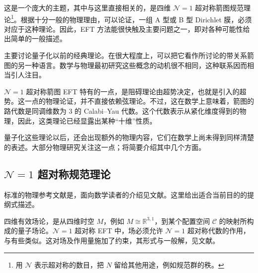 这是一个庞大的主题，其中与这里直接相关的，是四维 $\mathcal{N}=1$ 超对称箭图规范理论\footnote{用 $\mathcal{N}$ 表示超对称的数目，把 $N$ 留给其他用途，例如规范群的秩。}。根据十分一般的物理理由，可以论证，一组 A 型或 B 型 Dirichlet 膜，必须对应于这种理论。因此，EFT 方法能很快触及主要问题之一，即对各种可能性给出简单的一般描述。

主要讨论量子化以前的经典理论。在很大程度上，可以把它看作所讨论的带关系箭图的另一种语言。数学与物理最初研究这些概念的动机很不相同，这种联系因而相当引人注目。

$\mathcal{N}=1$ 超对称箭图 EFT 特有的一点，是阻碍理论由超势决定，也就是引入的超势。这一点的物理论证，并不直接依赖弦理论。不过，这在数学上意味着，箭图的路代数是同调维数为 3 的 Calabi--Yau 代数。这个代数表示从紧化维度得到的物理，因此，这类理论已经显露出某种“十维”性质。

量子化这些理论以后，还会出现额外的物理内容，它们在数学上尚未得到同样清楚的表述。大部分物理研究关注这一点；将简要介绍其中几个方面。

\subsection{\texorpdfstring{$\mathcal{N}=1$}{N=1} 超对称规范理论}\label{sec:5.4.1}

标准的物理参考文献是，面向数学读者的介绍见文献。这里给出适合当前目的的提纲式描述。

四维有效场论，是从四维时空 $M$，例如 $M\cong\mathbb{R}^{3,1}$，到某个配置空间 $\mathcal{C}$ 的映射所构成的量子场论。$\mathcal{N}=1$ 超对称 EFT 中，场必须允许 $\mathcal{N}=1$ 超对称代数的作用，与有些类似。这对场及作用量施加了约束，其形式与一般解，见文献。


